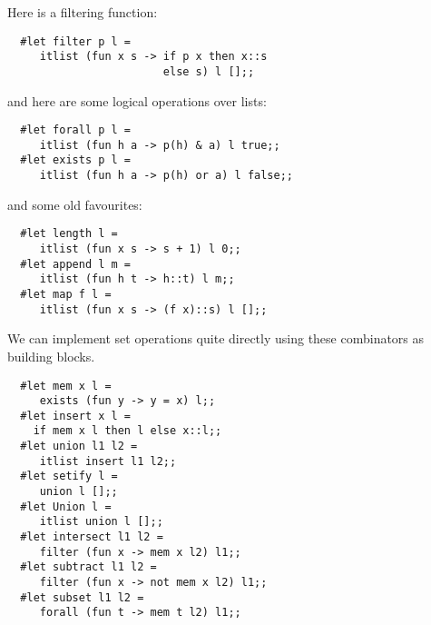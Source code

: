 \begin{slide*}


\vspace*{0.5cm}

Here is a filtering function:

\begin{black}\begin{verbatim}
  #let filter p l =
     itlist (fun x s -> if p x then x::s
                        else s) l [];;
\end{verbatim}\end{black}

and here are some logical operations over lists:

\begin{black}\begin{verbatim}
  #let forall p l =
     itlist (fun h a -> p(h) & a) l true;;
  #let exists p l =
     itlist (fun h a -> p(h) or a) l false;;
\end{verbatim}\end{black}

and some old favourites:

\begin{black}\begin{verbatim}
  #let length l =
     itlist (fun x s -> s + 1) l 0;;
  #let append l m =
     itlist (fun h t -> h::t) l m;;
  #let map f l =
     itlist (fun x s -> (f x)::s) l [];;
\end{verbatim}\end{black}

\end{slide*}


\begin{slide*}


\vspace*{0.5cm}

We can implement set operations quite directly using these combinators as
building blocks.

\begin{black}\begin{verbatim}
  #let mem x l =
     exists (fun y -> y = x) l;;
  #let insert x l =
    if mem x l then l else x::l;;
  #let union l1 l2 =
     itlist insert l1 l2;;
  #let setify l =
     union l [];;
  #let Union l =
     itlist union l [];;
  #let intersect l1 l2 =
     filter (fun x -> mem x l2) l1;;
  #let subtract l1 l2 =
     filter (fun x -> not mem x l2) l1;;
  #let subset l1 l2 =
     forall (fun t -> mem t l2) l1;;
\end{verbatim}\end{black}

\end{slide*}



